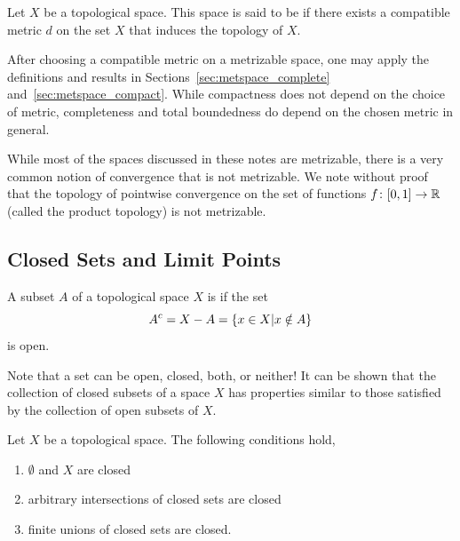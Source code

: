 \begin{definition}
Let $X$ be a topological space.
This space is said to be  if there exists a compatible metric $d$ on the set $X$ that induces the topology of $X$.
\end{definition}

After choosing a compatible metric on a metrizable space, one may apply the definitions and results in Sections~\ref{sec:metspace_complete} and~\ref{sec:metspace_compact}.
While compactness does not depend on the choice of metric, completeness and total boundedness do depend on the chosen metric in general.

\begin{example}
While most of the spaces discussed in these notes are metrizable, there is a very common notion of convergence that is not metrizable.
We note without proof that  the topology of pointwise convergence on the set of functions $f \colon [0,1]\rightarrow \mathbb{R}$ (called the product topology) is not metrizable.
\end{example}


\subsection{Closed Sets and Limit Points}

\begin{definition}
A subset $A$ of a topological space $X$ is  if the set
\begin{equation*}
{A}^{c} = X - A = \{ x \in X | x \notin A \}
\end{equation*}
is open.
\end{definition}

Note that a set can be open, closed, both, or neither!
It can be shown that the collection of closed subsets of a space $X$ has properties similar to those satisfied by the collection of open subsets of $X$.

\begin{fact}
Let $X$ be a topological space.
The following conditions hold,
\begin{enumerate}
\item $\emptyset$ and $X$ are closed
\item arbitrary intersections of closed sets are closed
\item finite unions of closed sets are closed.
\end{enumerate}
\end{fact}


